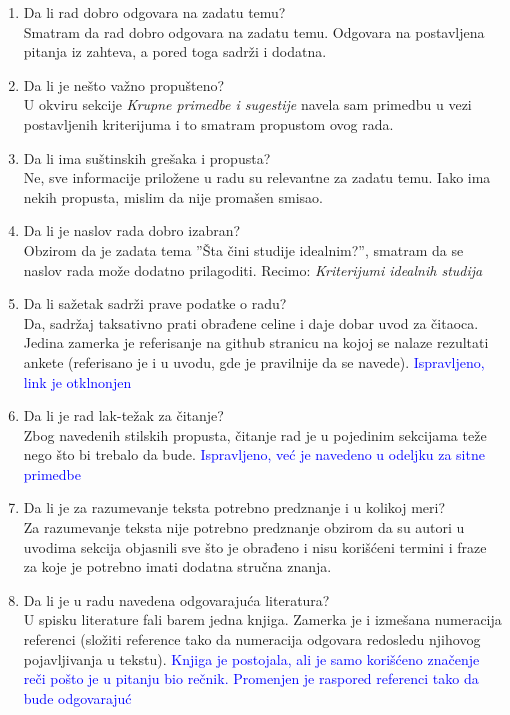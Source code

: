 \documentclass[a4paper]{report}
\newcommand{\odgovor}[1]{\textcolor{blue}{#1}}
\begin{document}
 \begin{enumerate}
 \item Da li rad dobro odgovara na zadatu temu?\\
 Smatram da rad dobro odgovara na zadatu temu. Odgovara na postavljena pitanja iz zahteva, a pored toga sadrži i dodatna.
 
 \item Da li je nešto važno propušteno?\\
 U okviru sekcije \textit{Krupne primedbe i sugestije} navela sam primedbu u vezi postavljenih kriterijuma i to smatram propustom ovog rada.
 
 \item Da li ima suštinskih grešaka i propusta?\\
 Ne, sve informacije priložene u radu su relevantne za zadatu temu. Iako ima nekih propusta, mislim da nije promašen smisao.
 
 \item Da li je naslov rada dobro izabran?\\
 Obzirom da je zadata tema ''Šta čini studije idealnim?'', smatram da se naslov rada može dodatno prilagoditi. Recimo: \textit{Kriterijumi idealnih studija}
 \odgovor{}
 
 \item Da li sažetak sadrži prave podatke o radu?\\
 Da, sadržaj taksativno prati obrađene celine i daje dobar uvod za čitaoca. Jedina zamerka je referisanje na github stranicu na kojoj se nalaze rezultati ankete (referisano je i u uvodu, gde je pravilnije da se navede).
 \odgovor{Ispravljeno, link je otklnonjen}
 
 \item Da li je rad lak-težak za čitanje?\\
 Zbog navedenih stilskih propusta, čitanje rad je u pojedinim sekcijama teže nego što bi trebalo da bude.
 \odgovor {Ispravljeno, već je navedeno u odeljku za sitne primedbe}
 
 \item Da li je za razumevanje teksta potrebno predznanje i u kolikoj meri?\\
 Za razumevanje teksta nije potrebno predznanje obzirom da su autori u uvodima sekcija objasnili sve što je obrađeno i nisu korišćeni termini i fraze za koje je potrebno imati dodatna stručna znanja.
 
 
 \item Da li je u radu navedena odgovarajuća literatura?\\
 U spisku literature fali barem jedna knjiga. Zamerka je i izmešana numeracija referenci (složiti reference tako da numeracija odgovara redosledu njihovog pojavljivanja u tekstu).
 \odgovor{Knjiga je postojala, ali je samo korišćeno značenje reči pošto je u pitanju bio rečnik. Promenjen je raspored referenci tako da bude odgovarajuć}
 

\end{enumerate}
\end{document}
